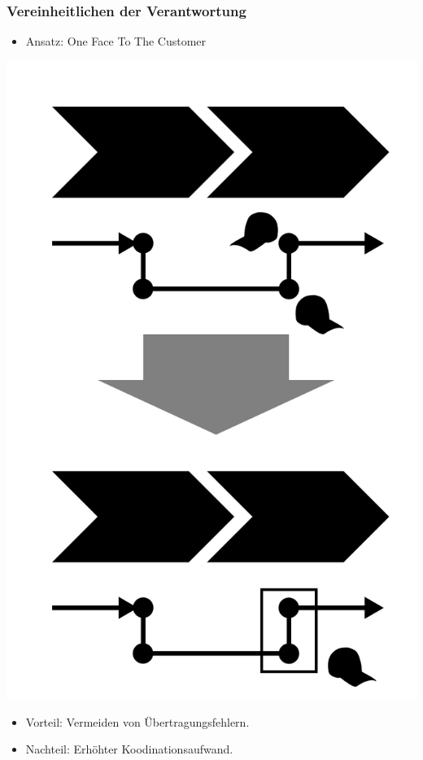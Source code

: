 \documentclass[xcolor=dvipsnames]{beamer}
\begin{document}
 \begin{frame}
  \frametitle{Vereinheitlichen der Verantwortung}
  \begin{itemize}
    \item Ansatz: \glqq One Face To The Customer\grqq
  \end{itemize}
  \centerline{\includegraphics[scale=2.5]{4_6_8.png}}
  \begin{itemize}
    \item Vorteil: Vermeiden von Übertragungsfehlern.
    \item Nachteil: Erhöhter Koodinationsaufwand.
  \end{itemize}
 \end{frame}
\end{document}
